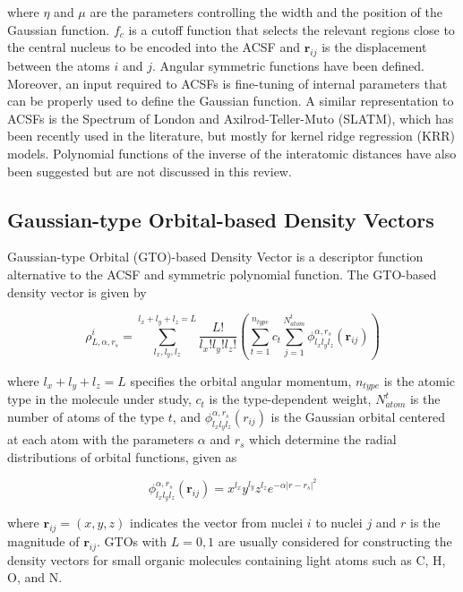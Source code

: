 \noindent where $\eta$ and $\mu$ are the parameters controlling the width and the position of 
the Gaussian function. $f_{c}$ is a cutoff function that selects the relevant regions close to 
the central nucleus to be encoded into the ACSF and $\boldsymbol{r}_{ij}$ is the displacement between 
the atoms $i$ and $j$. Angular symmetric functions have been defined.\cite{behler2011} 
Moreover, an input required to ACSFs is fine-tuning of internal parameters that can be properly used 
to define the Gaussian function. A similar representation to ACSFs is the Spectrum of London and 
Axilrod-Teller-Muto (SLATM), which has been recently used in the literature, but mostly for 
kernel ridge regression (KRR) models.\cite{faber2018} Polynomial functions of the inverse of 
the interatomic distances have also been suggested but are not discussed in this review.\cite{musil2021}

\subsection{Gaussian-type Orbital-based Density Vectors}

Gaussian-type Orbital (GTO)-based Density Vector is a descriptor function alternative to 
the ACSF and symmetric polynomial function.\cite{kwac2021} The GTO-based density vector is given by

\begin{equation}
    \rho^{i}_{L,\alpha,r_{s}} = \sum^{l_{x}+l_{y}+l_{z} = L}_{l_{x},l_{y},l_{z}} 
    \frac{L!}{l_{x}!l_{y}!l_{z}!} \left ( \sum^{n_{type}}_{t=1} c_{t} \sum^{N^{t}_{atom}}_{j=1} 
    \phi^{\alpha,r_{s}}_{l_{x}l_{y}l_{z}} (\boldsymbol{r}_{ij}) \right )
\end{equation}

\noindent where $l_{x}+l_{y}+l_{z} = L$ specifies the orbital angular momentum, $n_{type}$ is the atomic type 
in the molecule under study, $c_{t}$ is the type-dependent weight, $N^{t}_{atom}$ is the number of atoms of 
the type $t$, and $\phi^{\alpha,r_{s}}_{l_{x}l_{y}l_{z}} (r_{ij})$ is the Gaussian orbital centered at 
each atom with the parameters $\alpha$ and $r_{s}$ which determine the radial distributions of orbital functions, 
given as

\begin{equation}
    \phi^{\alpha,r_{s}}_{l_{x}l_{y}l_{z}} (\boldsymbol{r}_{ij}) = x^{l_{x}}y^{l_{y}}z^{l_{z}} e^{-\alpha 
    |r-r_{s}|^{2}}
\end{equation}

\noindent where $\boldsymbol{r}_{ij} = (x,y,z)$ indicates the vector from nuclei $i$ to nuclei $j$ and $r$ 
is the magnitude of $\boldsymbol{r}_{ij}$. GTOs with $L=0,1$ are usually considered for constructing 
the density vectors for small organic molecules containing light atoms such as C, H, O, and N.\cite{kwac2021}
